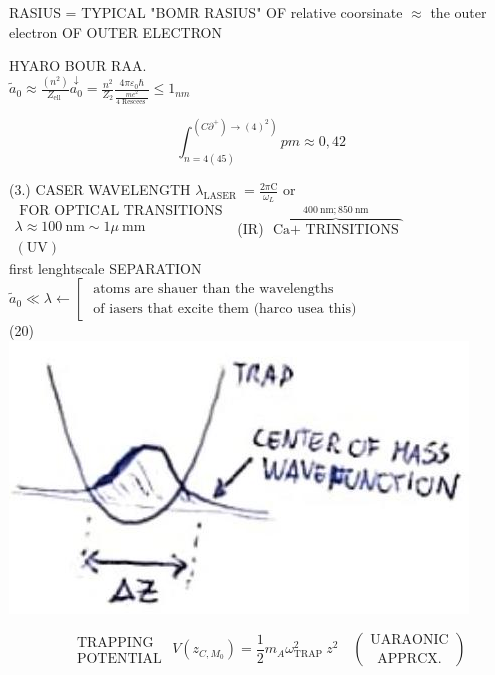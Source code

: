 \documentclass[10pt]{article}
\begin{document}
RASIUS = TYPICAL "BOMR RASIUS" OF relative coorsinate $\approx$ the outer electron OF OUTER ELECTRON

HYARO BOUR RAA.\\
$\tilde{a}_{0} \approx \frac{\left(n^{2}\right)}{Z_{\text {ell }}} \stackrel{\downarrow}{a_{0}}=\frac{n^{2}}{Z_{2}} \frac{4 \pi \varepsilon_{0} \hbar}{\frac{m e^{2}}{4 \text { Rescees }}} \leqslant 1_{n m}$

$$
\int_{n=4(45)}^{\left.\left(C \partial^{+}\right) \rightarrow(4)^{2}\right)} p m \approx 0,42
$$

(3.) CASER WAVELENGTH $\lambda_{\text {LASER }}=\frac{2 \pi \mathrm{C}}{\omega_{L}}$ or $\begin{gathered}\text { FOR OPTICAL TRANSITIONS } \\ \lambda \approx 100 \mathrm{~nm} \sim 1 \mu \mathrm{~mm} \\ (\mathrm{UV})\end{gathered}$ (IR) $\overbrace{\text { Ca+ TRINSITIONS }}^{400 \mathrm{~nm} ; 850 \mathrm{~nm}}$\\
first lenghtscale SEPARATION\\
$\tilde{a}_{0} \ll \lambda \leftarrow\left[\begin{array}{l}\text { atoms are shauer than the wavelengths } \\ \text { of iasers that excite them (harco usea this) }\end{array}\right.$\\
(20)\\
\includegraphics[max width=\textwidth, center]{2025_10_16_9146de9f5ba4f09535e7g-2}

$$
\begin{aligned}
& \text { TRAPPING } \\
& \text { POTENTIAL }
\end{aligned} V\left(z_{C, M_{0}}\right)=\frac{1}{2} m_{A} \omega_{\text {TRAP }}^{2} z^{2} \quad\binom{\text { UARAONIC }}{\text { APPRCX. }}
$$
\end{document}
